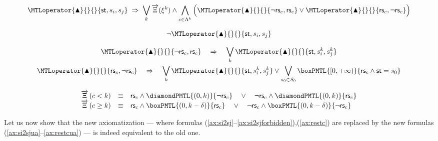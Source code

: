 \documentclass[a4paper]{article}
\newcommand{\frf}[1]{(\ref{#1})}
\newcommand{\fsrf}[2]{(\ref{#1}--\ref{#2})}
\newcommand{\st}{\mathsf{st}}
\newcommand{\rest}[1]{\mathsf{rs}_{#1}}
\newcommand{\becomesOMTL}[1]{\MTLoperator{\blacktriangle}{}{}{#1}}
\newcommand{\becomesLMTL}[1]{\becomesOMTL{#1}}
\newcommand{\XiL}{\overrightarrow{\Xi}}
\theoremstyle{plain}
\theoremstyle{definition}
\begin{document}
\begin{multline} \label{ax:si2sjua}
  \becomesLMTL{\st, s_i, s_j} \;\Rightarrow\; 
     \bigvee_k  \XiL(\xi^k) \wedge \bigwedge_{c \in \Lambda^k}
               \Big( \becomesLMTL{\neg \rest{c}, \rest{c}} \vee \becomesLMTL{\rest{c}, \neg \rest{c}} \Big)
\end{multline}

\begin{equation} \label{ax:si2sjforbiddenua}
  \neg \becomesLMTL{\st, s_i, s_j}  \end{equation}

\begin{gather} 
  \becomesLMTL{\neg \rest{c}, \rest{c}} \quad \Rightarrow \quad 
       \bigvee_k \becomesLMTL{\st, s_i^k, s_j^k} \nonumber \\
  \becomesLMTL{\rest{c}, \neg \rest{c}} \quad \Rightarrow \quad 
       \bigvee_k \becomesLMTL{\st, s_i^k, s_j^k}  \vee \bigvee_{s_0 \in S_0} \boxPMTL{[0, +\infty)}{\rest{c} \wedge \st = s_0} \label{ax:restcua}
\end{gather}

\begin{displaymath}
  \begin{array}{lcl}
	 \XiL\left(c < k\right)      &   \equiv  &
              \rest{c} \wedge \diamondPMTL{(0, k)}{\neg \rest{c}}
               \quad \vee \quad \neg \rest{c} \wedge \diamondPMTL{(0, k)}{\rest{c}}\\
	 \XiL\left(c \geq k\right)      &   \equiv  &
              \rest{c} \wedge \boxPMTL{(0, k-\delta)}{\rest{c}}
              \quad \vee \quad \neg \rest{c} \wedge \boxPMTL{(0, k-\delta)}{\neg \rest{c}} \\
  \end{array}
\end{displaymath}


Let us now show that the new axiomatization --- where formulas \fsrf{ax:si2sj}{ax:si2sjforbidden},\frf{ax:restc} are replaced by the new formulas \fsrf{ax:si2sjua}{ax:restcua} --- is indeed equivalent to the old one.
\end{document}
